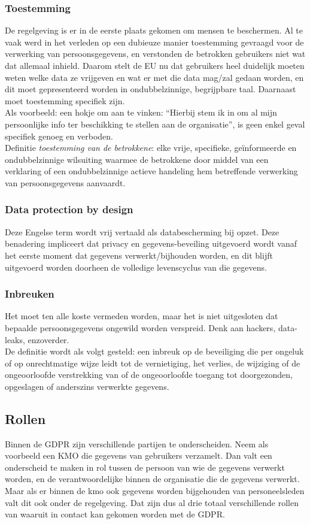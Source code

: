 \subsubsection{Toestemming} 
De regelgeving is er in de eerste plaats gekomen om mensen te beschermen. Al te vaak werd in het verleden op een dubieuze manier toestemming gevraagd voor de verwerking van persoonsgegevens, en verstonden de betrokken gebruikers niet wat dat allemaal inhield. Daarom stelt de EU nu dat gebruikers heel duidelijk moeten weten welke data ze vrijgeven en wat er met die data mag/zal gedaan worden, en dit moet gepresenteerd worden in ondubbelzinnige, begrijpbare taal.
Daarnaast moet toestemming specifiek zijn.
\\ Als voorbeeld: een hokje om aan te vinken: “Hierbij stem ik in om al mijn persoonlijke info ter beschikking te stellen aan de organisatie”, is geen enkel geval specifiek genoeg en verboden.\\ Definitie \textit{toestemming van de betrokkene}: elke vrije, specifieke, geïnformeerde en ondubbelzinnige wilsuiting waarmee de betrokkene door middel van een verklaring of een ondubbelzinnige actieve handeling hem betreffende verwerking van persoonsgegevens aanvaardt. 

\subsubsection{Data protection by design}
Deze Engelse term wordt vrij vertaald als databescherming bij opzet. Deze benadering impliceert dat privacy en gegevens-beveiling uitgevoerd wordt vanaf het eerste moment dat gegevens verwerkt/bijhouden worden, en dit blijft uitgevoerd worden doorheen de volledige levenscyclus van die gegevens. 

\subsubsection{Inbreuken} 
Het moet ten alle koste vermeden worden, maar het is niet uitgesloten dat bepaalde persoonsgegevens ongewild worden verspreid. Denk aan hackers, data-leaks, enzoverder.
\\ De definitie wordt als volgt gesteld: een inbreuk op de beveiliging die per ongeluk of op onrechtmatige wijze leidt tot de vernietiging, het verlies, de wijziging of de ongeoorloofde verstrekking van of de ongeoorloofde toegang tot doorgezonden, opgeslagen of anderszins verwerkte gegevens. 

\subsection{Rollen}
Binnen de GDPR zijn verschillende partijen te onderscheiden. Neem als voorbeeld een KMO die gegevens van gebruikers verzamelt. Dan valt een onderscheid te maken in rol tussen de persoon van wie de gegevens verwerkt worden, en de verantwoordelijke binnen de organisatie die de gegevens verwerkt. Maar als er binnen de kmo ook gegevens worden bijgehouden van personeelsleden valt dit ook onder de regelgeving. Dat zijn dus al drie totaal verschillende rollen van waaruit in contact kan gekomen worden met de GDPR. 

